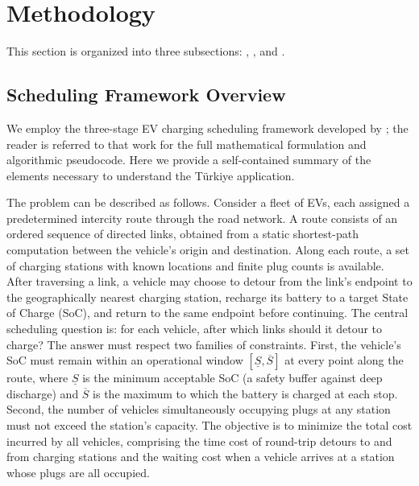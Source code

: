 \section{Methodology}\label{sec:method}

This section is organized into three subsections: , , and .

\subsection{Scheduling Framework Overview}\label{sec:framework_summary}

We employ the three-stage EV charging scheduling framework developed by \citet{cokyasar2026electrification}; the reader is referred to that work for the full mathematical formulation and algorithmic pseudocode. Here we provide a self-contained summary of the elements necessary to understand the T\"{u}rkiye application.

The problem can be described as follows. Consider a fleet of EVs, each assigned a predetermined intercity route through the road network. A route consists of an ordered sequence of directed links, obtained from a static shortest-path computation between the vehicle's origin and destination. Along each route, a set of charging stations with known locations and finite plug counts is available. After traversing a link, a vehicle may choose to detour from the link's endpoint to the geographically nearest charging station, recharge its battery to a target State of Charge (SoC), and return to the same endpoint before continuing. The central scheduling question is: for each vehicle, after which links should it detour to charge? The answer must respect two families of constraints. First, the vehicle's SoC must remain within an operational window $[\underline{S}, \overline{S}]$ at every point along the route, where $\underline{S}$ is the minimum acceptable SoC (a safety buffer against deep discharge) and $\overline{S}$ is the maximum to which the battery is charged at each stop. Second, the number of vehicles simultaneously occupying plugs at any station must not exceed the station's capacity. The objective is to minimize the total cost incurred by all vehicles, comprising the time cost of round-trip detours to and from charging stations and the waiting cost when a vehicle arrives at a station whose plugs are all occupied.

